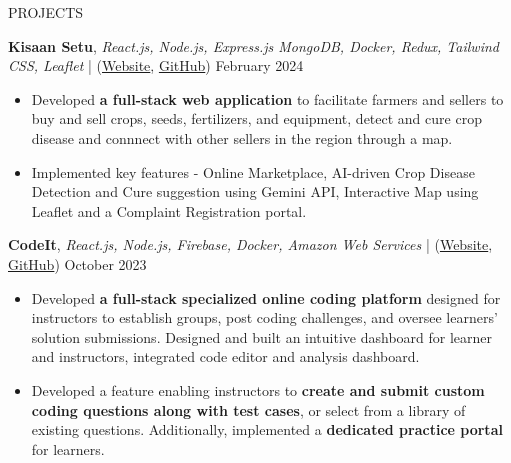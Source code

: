 \documentclass{resume} %
\begin{document}
\begin{rSection}{PROJECTS}
    \vspace{-1.25em}

    \item \textbf{Kisaan Setu}, \textit{React.js, Node.js, Express.js MongoDB, Docker, Redux, Tailwind CSS, Leaflet} | (\href{https://kisaansetu.netlify.app/}{Website}, \href{https://github.com/ninadnaik10/KisaanSetu}{GitHub}) \hfill {February 2024}
    \begin{itemize}
        \setlength\itemsep{-0.6em}
        \item Developed \textbf{a full-stack web application} to facilitate farmers and sellers to buy and sell crops, seeds, fertilizers, and equipment, detect and cure crop disease and connnect with other sellers in the region through a map.
        \item Implemented key features - Online Marketplace, AI-driven Crop Disease Detection and Cure suggestion using Gemini API, Interactive Map using Leaflet and a Complaint Registration portal.
    \end{itemize}

    \item \textbf{CodeIt}, \textit{React.js, Node.js, Firebase, Docker, Amazon Web Services} | (\href{https://codeitonline.xyz/}{Website}, \href{https://github.com/ninadnaik10/codeit}{GitHub}) \hfill {October 2023}
    \begin{itemize}
        \setlength\itemsep{-0.6em}
        \item Developed \textbf{a full-stack specialized online coding platform} designed for instructors to establish groups, post coding challenges, and oversee learners' solution submissions. Designed and built an intuitive dashboard for learner and instructors, integrated code editor and analysis dashboard.
        \item Developed a feature enabling instructors to \textbf{create and submit custom coding questions along with test cases}, or select from a library of existing questions. Additionally, implemented a \textbf{dedicated practice portal} for learners.
    \end{itemize}


\end{rSection}
\end{document}
